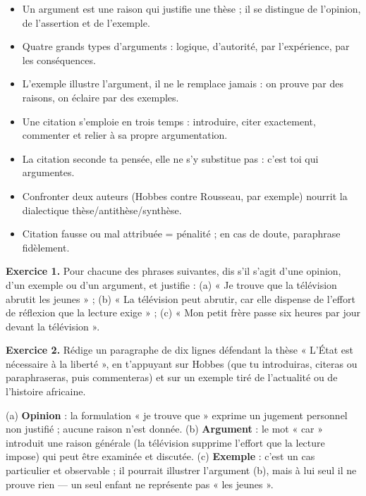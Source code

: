 \documentclass[11pt]{article}
\newcommand{\cle}[1]{{\popxbold\color{popdark}#1}}
\begin{document}
\begin{aretenir}
\begin{itemize}
\item Un \cle{argument} est une raison qui justifie une thèse ; il se distingue de l'opinion, de l'assertion et de l'exemple.
\item Quatre grands types d'arguments : logique, d'autorité, par l'expérience, par les conséquences.
\item L'exemple illustre l'argument, il ne le remplace jamais : on prouve par des raisons, on éclaire par des exemples.
\item Une citation s'emploie en trois temps : introduire, citer exactement, commenter et relier à sa propre argumentation.
\item La citation seconde ta pensée, elle ne s'y substitue pas : c'est toi qui argumentes.
\item Confronter deux auteurs (Hobbes contre Rousseau, par exemple) nourrit la dialectique thèse/antithèse/synthèse.
\item Citation fausse ou mal attribuée = pénalité ; en cas de doute, paraphrase fidèlement.
\end{itemize}
\end{aretenir}

\begin{exercice}
\textbf{Exercice 1.} Pour chacune des phrases suivantes, dis s'il s'agit d'une opinion, d'un exemple ou d'un argument, et justifie : (a) « Je trouve que la télévision abrutit les jeunes » ; (b) « La télévision peut abrutir, car elle dispense de l'effort de réflexion que la lecture exige » ; (c) « Mon petit frère passe six heures par jour devant la télévision ».

\textbf{Exercice 2.} Rédige un paragraphe de dix lignes défendant la thèse « L'État est nécessaire à la liberté », en t'appuyant sur Hobbes (que tu introduiras, citeras ou paraphraseras, puis commenteras) et sur un exemple tiré de l'actualité ou de l'histoire africaine.
\end{exercice}

\begin{corrige}[Exercice 1]
(a) \textbf{Opinion} : la formulation « je trouve que » exprime un jugement personnel non justifié ; aucune raison n'est donnée. (b) \textbf{Argument} : le mot « car » introduit une raison générale (la télévision supprime l'effort que la lecture impose) qui peut être examinée et discutée. (c) \textbf{Exemple} : c'est un cas particulier et observable ; il pourrait illustrer l'argument (b), mais à lui seul il ne prouve rien — un seul enfant ne représente pas « les jeunes ».
\end{corrige}
\end{document}
